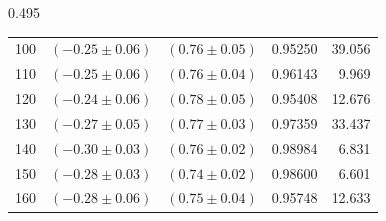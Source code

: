 \begin{landscape}
\begin{table}
\begin{subtable}{0.495\linewidth}
{\begin{tabular}{c c c c r}
100 & $(-0.25\pm0.06)$  & $(0.76\pm0.05)$  & 0.95250 & 39.056\\
110 & $(-0.25\pm0.06)$  & $(0.76\pm0.04)$  & 0.96143 & 9.969\\
120 & $(-0.24\pm0.06)$  & $(0.78\pm0.05)$  & 0.95408 & 12.676\\
130 & $(-0.27\pm0.05)$  & $(0.77\pm0.03)$  & 0.97359 & 33.437\\
140 & $(-0.30\pm0.03)$  & $(0.76\pm0.02)$  & 0.98984 & 6.831\\
150 & $(-0.28\pm0.03)$  & $(0.74\pm0.02)$  & 0.98600 & 6.601\\
160 & $(-0.28\pm0.06)$  & $(0.75\pm0.04)$  & 0.95748 & 12.633\\
\bottomrule
\end{tabular}} 
\end{subtable}

\vspace{3.21em} %


\end{table}
\end{landscape}
